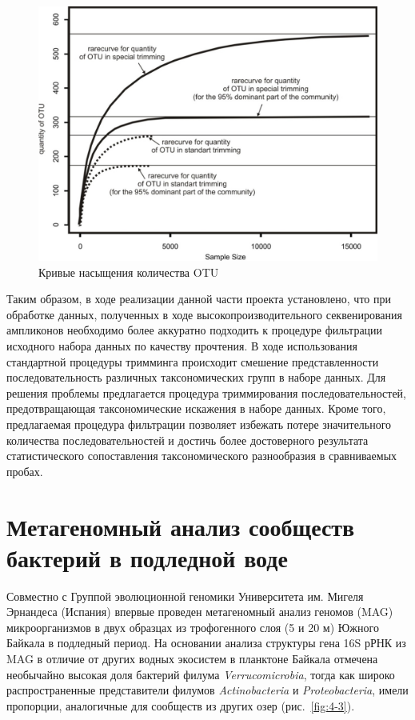 \documentclass[a4paper,12pt,openany,final]{extreport}
\def\oldcaption{} \let\oldcaption=\caption
\def\caption{\stepcounter{captionsnum}\oldcaption}
\begin{document}
\begin{figure}\centering
\includegraphics[width=0.6\linewidth]{media/image7.jpeg}

\caption{Кривые насыщения количества OTU}\label{fig:3-1}
\end{figure}

Таким образом, в ходе реализации данной части проекта
установлено, что при обработке данных, полученных в ходе
высокопроизводительного секвенирования ампликонов необходимо более
аккуратно подходить к процедуре фильтрации исходного набора данных по
качеству прочтения. В ходе использования стандартной процедуры тримминга
происходит смешение представленности последовательность различных
таксономических групп в наборе данных. Для решения проблемы предлагается
процедура триммирования последовательностей, предотвращающая
таксономические искажения в наборе данных. Кроме того, предлагаемая
процедура фильтрации позволяет избежать потере значительного количества
последовательностей и достичь более достоверного результата
статистического сопоставления таксономического разнообразия в
сравниваемых пробах.

\chapter{Метагеномный анализ сообществ бактерий в подледной воде} \label{chap:3}

Совместно с Группой эволюционной геномики Университета им. Мигеля
Эрнандеса (Испания) впервые проведен метагеномный анализ геномов (MAG)
микроорганизмов в двух образцах из трофогенного слоя (5 и 20 м) Южного
Байкала в подледный период. На основании анализа структуры гена 16S рРНК
из MAG в отличие от других водных экосистем в планктоне Байкала отмечена
необычайно высокая доля бактерий филума \emph{Verrucomicrobia}, тогда
как широко распространенные представители филумов \emph{Actinobacteria}
и \emph{Proteobacteria}, имели пропорции, аналогичные для сообществ из
других озер (рис.~\ref{fig:4-3}).
\end{document}
